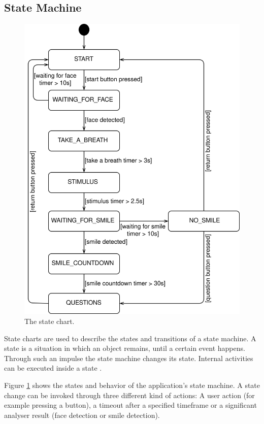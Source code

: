 \subsection{State Machine}

\begin{figure}
  \includegraphics[width=\linewidth]{figures/state_chart.png}
  \caption{The state chart.}
  \label{fig:state_chart}
\end{figure}

State charts are used to describe the states and transitions of a state machine. A state is a situation in which an object remains, until a certain event happens. Through such an impulse the state machine changes its state. Internal activities can be executed inside a state \cite{Modeling_with_UML}.

Figure \ref{fig:state_chart} shows the states and behavior of the application's state machine.
A state change can be invoked through three different kind of actions: A user action (for example pressing a button), a timeout after a specified timeframe or a significant analyser result (face detection or smile detection).

